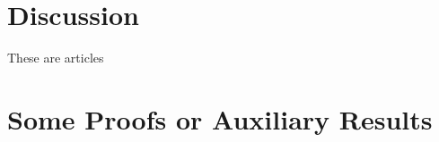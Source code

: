 \documentclass{article}
\begin{document}
\section{Discussion}




These are articles \cite{Caruana08,Delgado14}





\appendix

\section{Some Proofs or Auxiliary Results}


\newpage
\small{


}
\end{document}
